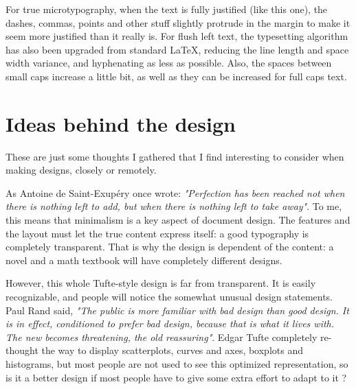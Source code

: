 \documentclass[
    11pt,
]{tufte-style-thesis}
\begin{document}
\bgroup\justifying
For true microtypography, when the text is fully justified (like this one), the dashes, commas, points and other stuff slightly protrude in the margin to make it seem more justified than it really is. For flush left text, the typesetting algorithm has also been upgraded from standard \LaTeX, reducing the line length and space width variance, and hyphenating as less as possible. Also, the spaces between small caps increase a little bit, as well as they can be increased for full caps text.
\egroup


\section{Ideas behind the design}

These are just some thoughts I gathered that I find interesting to consider when making designs, closely or remotely.

As Antoine de Saint-Exupéry once wrote: \textit{"Perfection has been reached not when there is nothing left to add, but when there is nothing left to take away"}. To me, this means that minimalism is a key aspect of document design. The features and the layout must let the true content express itself: a good typography is completely transparent. That is why the design is dependent of the content: a novel and a math textbook will have completely different designs.

However, this whole Tufte-style design is far from transparent. It is easily recognizable, and people will notice the somewhat unusual design statements. Paul Rand said, \textit{"The public is more familiar with bad design than good design. It is in effect, conditioned to prefer bad design, because that is what it lives with. The new becomes threatening, the old reassuring"}. Edgar Tufte completely re-thought the way to display scatterplots, curves and axes, boxplots and histograms, but most people are not used to see this optimized representation, so is it a better design if most people have to give some extra effort to adapt to it ?
\end{document}
